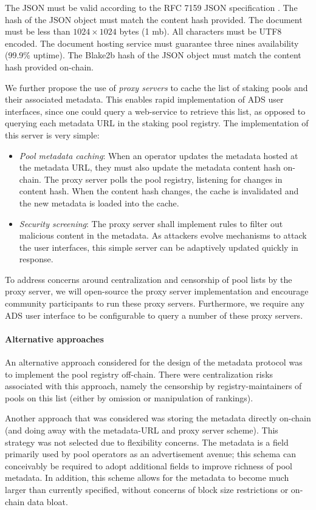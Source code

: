 The JSON must be valid according to the RFC 7159 JSON specification \cite{rfc7159}. The hash of the JSON object must match the content hash provided. The document must be less than $1024\times1024$ bytes (1 mb). All characters must be UTF8 encoded. The document hosting service must guarantee three nines availability (99.9\% uptime). The Blake2b hash of the JSON object must match the content hash provided on-chain. 

We further propose the use of \textit{proxy servers} to cache the list of staking pools and their associated metadata. This enables rapid implementation of ADS user interfaces, since one could query a web-service to retrieve this list, as opposed to querying each metadata URL in the staking pool registry. The implementation of this server is very simple:
\begin{itemize}
    \item \textit{Pool metadata caching}: When an operator updates the metadata hosted at the metadata URL, they must also update the metadata content hash on-chain. The proxy server polls the pool registry, listening for changes in content hash. When the content hash changes, the cache is invalidated and the new metadata is loaded into the cache. 
    \item \textit{Security screening}: The proxy server shall implement rules to filter out malicious content in the metadata. As attackers evolve mechanisms to attack the user interfaces, this simple server can be adaptively updated quickly in response. 
\end{itemize}

To address concerns around centralization and censorship of pool lists by the proxy server, we will open-source the proxy server implementation and encourage community participants to run these proxy servers. Furthermore, we require any ADS user interface to be configurable to query a number of these proxy servers.

\paragraph{Alternative approaches} An alternative approach considered for the design of the metadata protocol was to implement the pool registry off-chain. There were centralization risks associated with this approach, namely the censorship by registry-maintainers of pools on this list (either by omission or manipulation of rankings). 

Another approach that was considered was storing the metadata directly on-chain (and doing away with the metadata-URL and proxy server scheme). This strategy was not selected due to flexibility concerns. The metadata is a field primarily used by pool operators as an advertisement avenue; this schema can conceivably be required to adopt additional fields to improve richness of pool metadata. In addition, this scheme allows for the metadata to become much larger than currently specified, without concerns of block size restrictions or on-chain data bloat. 

